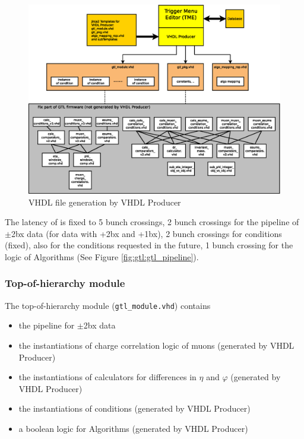 \begin{figure}[htb]
\centering
\includegraphics[width=15cm]{figures/tme_gtl}
\caption{VHDL file generation by VHDL Producer} 
\label{fig:gtl:tme_gtl}
\end{figure}

The latency of \ugtl is fixed to 5 bunch crossings,
2 bunch crossings for the pipeline of $\pm$2bx data (for data with +2bx and +1bx), 2 bunch crossings for conditions (fixed), also for the conditions requested in the future,
1 bunch crossing for the logic of Algorithms (See Figure \ref{fig:gtl:gtl_pipeline}).\\

\subsubsection{Top-of-hierarchy module}
\label{sec:gtl:top_module}

The top-of-hierarchy module (\texttt{gtl\_module.vhd}) contains 
\begin {itemize}
\item the pipeline for $\pm$2bx data
\item the instantiations of charge correlation logic of muons (generated by VHDL Producer)
\item the instantiations of calculators for differences in $\eta$ and $\varphi$ (generated by VHDL Producer)
\item the instantiations of conditions (generated by VHDL Producer)
\item a boolean logic for Algorithms (generated by VHDL Producer)
\end {itemize}

